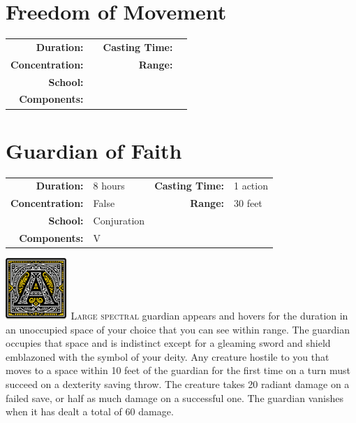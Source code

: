 \documentclass[12pt,showtrims]{memoir}
\begin{document}
\section*{Freedom of Movement}
{
\small\centering\vspace{-6pt}
\begin{tabular}{rlrl}
\toprule

\textbf{Duration:} &  &
\textbf{Casting Time:} &  \\
\textbf{Concentration:} & &
\textbf{Range:} &  \\
\textbf{School:} &  \\
\textbf{Components:} & \multicolumn{3}{p{0.7\textwidth}}{}\\

\bottomrule
\end{tabular}
}
\newpage
{}
\newpage
\section*{Guardian of Faith}

{
\small\centering\vspace{-6pt}
\begin{tabular}{rlrl}
\toprule

\textbf{Duration:} & 8 hours &
\textbf{Casting Time:} & 1 action \\
\textbf{Concentration:} & False &
\textbf{Range:} & 30 feet \\
\textbf{School:} & Conjuration \\
\textbf{Components:} & \multicolumn{3}{p{0.7\textwidth}}{V}\\

\bottomrule
\end{tabular}
}

\vspace{1\baselineskip}\noindent 
\vspace{1\baselineskip}\noindent
\lettrine[lines=4]{\includegraphics[height=66pt]{initials/A.png}}{\ Large spectral} guardian appears and hovers for the duration in an unoccupied space of your choice that you can see within range. The guardian occupies that space and is indistinct except for a gleaming sword and shield emblazoned with the symbol of your deity. Any creature hostile to you that moves to a space within 10 feet of the guardian for the first time on a turn must succeed on a dexterity saving throw. The creature takes 20 radiant damage on a failed save, or half as much damage on a successful one. The guardian vanishes when it has dealt a total of 60 damage.
\end{document}
